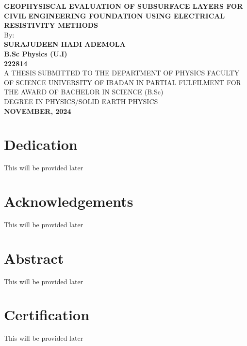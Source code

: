 \documentclass[12pt,a4paper]{report}
\begin{document}
\begin{titlepage}
    \begin{center}
        \large\textbf{GEOPHYSISCAL EVALUATION OF SUBSURFACE LAYERS FOR CIVIL}
        \large\textbf{ENGINEERING FOUNDATION USING ELECTRICAL RESISTIVITY METHODS} \\[3.3cm]
        
        By: \\[0.5cm]
        
        \Large\textbf{SURAJUDEEN HADI ADEMOLA} \\[0.2cm]
        \Large\textbf{B.Sc Physics (U.I)} \\[0.2cm]
        \Large\textbf{222814} \\[2.5cm]
        
        \large{A THESIS SUBMITTED TO THE DEPARTMENT OF PHYSICS FACULTY OF SCIENCE
        UNIVERSITY OF IBADAN IN PARTIAL FULFILMENT FOR THE AWARD OF BACHELOR IN SCIENCE (B.Sc) \\
        DEGREE IN PHYSICS/SOLID EARTH PHYSICS} \\[4cm]
        
        \textbf{NOVEMBER, 2024}
    \end{center}
\end{titlepage}

\chapter*{Dedication}
\justifying
This will be provided later

\chapter*{Acknowledgements}
\justifying
This will be provided later

\chapter*{Abstract}
\justifying
This will be provided later

\chapter*{Certification}
\justifying
This will be provided later
\end{document}
